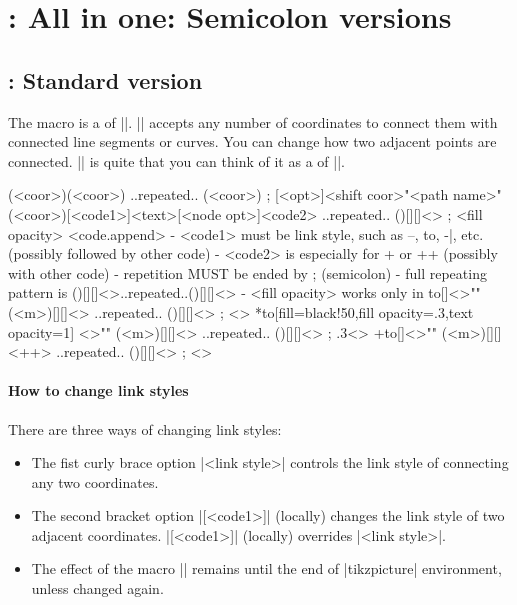 \section{\protect\cmd{\tzlinks}: All in one: Semicolon versions}
\label{s:tzlinks}

\subsection{\protect\cmd{\tzlinks}: Standard version}
\label{ss:tzlinks}

The macro \icmd{\tzlinks} is a  of |\tzlink|. |\tzlinks| accepts any number of coordinates to connect them with connected line segments or curves.
You can change how two adjacent points are connected.
|\tzlinks| is quite  that you can think of it as a  of |\tzlines|.


\begin{tzdef}
\tzlinks (<coor>)(<coor>) ..repeated.. (<coor>) ;
[<opt>]<shift coor>"<path name>"
        (<coor>)[<code1>]{<text>}[<node opt>]<code2>
        ..repeated.. ()[]{}[]<> ; {<fill opacity>} <code.append>
  - <code1> must be link style, such as --, to, -|, etc.
           (possibly followed by other code)
  - <code2> is especially for + or ++
           (possibly with other code)
  - repetition MUST be ended by ; (semicolon)
  - full repeating pattern is ()[]{}[]<>..repeated..()[]{}[]<>
  - {<fill opacity>} works only in \tzlinks*
  {to}[]<>"" (<m>)[]{}[]<>   ..repeated.. ()[]{}[]<> ; {  }<>
 *{to}[fill=black!50,fill opacity=.3,text opacity=1]
        <>"" (<m>)[]{}[]<>   ..repeated.. ()[]{}[]<> ; {.3}<>
 +{to}[]<>"" (<m>)[]{}[]<++> ..repeated.. ()[]{}[]<> ; {  }<>
\end{tzdef}

\paragraph{How to change link styles}
There are three ways of changing link styles:
\begin{itemize}\firmlist
\item The fist curly brace option |{<link style>}| controls the link style of connecting any two coordinates.
\item The second bracket option |[<code1>]| (locally) changes the link style of two adjacent coordinates. |[<code1>]| (locally) overrides |{<link style>}|.
\item The effect of the macro |\settzlinkstyle| remains until the end of |tikzpicture| environment, unless changed again.
\end{itemize}

